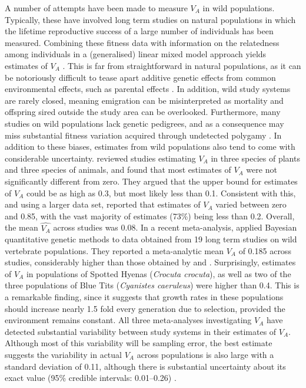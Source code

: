 \documentclass[12pt]{article}
\begin{document}
\begin{bibunit}
A number of attempts have been made to measure $V_A$ in wild populations. Typically, these have involved long term studies on natural populations in which the lifetime reproductive success of a large number of individuals has been measured. Combining these fitness data with information on the relatedness among individuals in a (generalised) linear mixed model approach yields estimates of $V_A$ \citep{kruuk2004estimating}. This is far from straightforward in natural populations, as it can be notoriously difficult to tease apart additive genetic effects from common environmental effects, such as parental effects \citep{kruuk2007separate, shaw2014quantitative}. In addition, wild study systems are rarely closed, meaning emigration can be misinterpreted as mortality and offspring sired outside the study area can be overlooked. Furthermore, many studies on wild populations lack genetic pedigrees, and as a consequence may miss substantial fitness variation acquired through undetected polygamy \citep{vedder2011polygyny, charmantier2006testing}. In addition to these biases, estimates from wild populations also tend to come with considerable uncertainty. \citet{burt1995evolution} reviewed studies estimating $V_A$ in three species of plants and three species of animals, and found that most estimates of $V_A$ were not significantly different from zero. They argued that the upper bound for estimates of $V_A$ could be as high as 0.3, but most likely less than 0.1. Consistent with this, and using a larger data set, \citet{hendry2018contemporary} reported that estimates of $V_A$ varied between zero and 0.85, with the vast majority of estimates (73\%) being less than 0.2. Overall, the mean $\widehat{V_A}$ across studies was 0.08. In a recent meta-analysis, \citet{bonnet2022genetic} applied Bayesian quantitative genetic methods to data obtained from 19 long term studies on wild vertebrate populations. They reported a meta-analytic mean $V_A$ of 0.185 across studies, considerably higher than those obtained by \citet{burt1995evolution} and \citet{hendry2018contemporary}. Surprisingly, estimates of $V_A$ in populations of Spotted Hyenas (\emph{Crocuta crocuta}), as well as two of the three populations of Blue Tits (\emph{Cyanistes caeruleus}) were higher than 0.4. This is a remarkable finding, since it suggests that growth rates in these populations should increase nearly 1.5 fold every generation due to selection, provided the environment remains constant. All three meta-analyses investigating $V_A$ \citep{burt1995evolution,hendry2018contemporary,bonnet2022genetic} have detected substantial variability between study systems in their estimates of $V_A$. Although most of this variability will be sampling error, the best estimate suggests the variability in actual $V_A$ across populations is also large with a standard deviation of 0.11, although there is substantial uncertainty about its exact value (95\% credible intervals: 0.01--0.26) \citep{bonnet2022genetic}.  


\end{bibunit}
\end{document}

